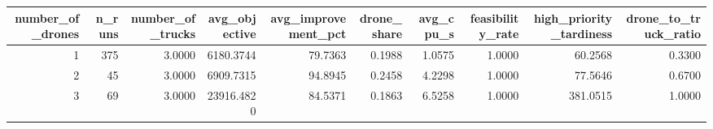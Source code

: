 \begin{tabular}{rrrrrrrrrr}
\toprule
number_of_drones & n_runs & number_of_trucks & avg_objective & avg_improvement_pct & drone_share & avg_cpu_s & feasibility_rate & high_priority_tardiness & drone_to_truck_ratio \\
\midrule
1 & 375 & 3.0000 & 6180.3744 & 79.7363 & 0.1988 & 1.0575 & 1.0000 & 60.2568 & 0.3300 \\
2 & 45 & 3.0000 & 6909.7315 & 94.8945 & 0.2458 & 4.2298 & 1.0000 & 77.5646 & 0.6700 \\
3 & 69 & 3.0000 & 23916.4820 & 84.5371 & 0.1863 & 6.5258 & 1.0000 & 381.0515 & 1.0000 \\
\bottomrule
\end{tabular}
